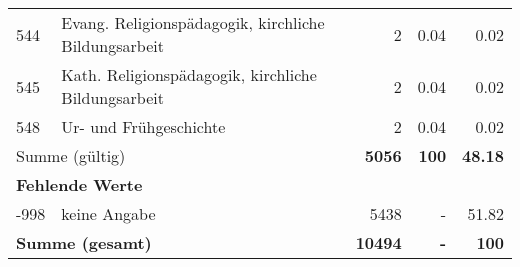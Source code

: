 \begin{longtable}{lXrrr}
        544 & \multicolumn{1}{X}{Evang. Religionspädagogik, kirchliche Bildungsarbeit} & %
          \num{2} &
          \num[round-mode=places,round-precision=2]{0.04} &
          \num[round-mode=places,round-precision=2]{0.02} \\

        545 & \multicolumn{1}{X}{Kath. Religionspädagogik, kirchliche Bildungsarbeit} & %
          \num{2} &
          \num[round-mode=places,round-precision=2]{0.04} &
          \num[round-mode=places,round-precision=2]{0.02} \\

        548 & \multicolumn{1}{X}{Ur- und Frühgeschichte} & %
          \num{2} &
          \num[round-mode=places,round-precision=2]{0.04} &
          \num[round-mode=places,round-precision=2]{0.02} \\

     \midrule
     \multicolumn{2}{l}{Summe (gültig)} &
       \textbf{\num{5056}} &
     \textbf{\num{100}} &
       \textbf{\num[round-mode=places,round-precision=2]{48.18}} \\
     \multicolumn{5}{l}{\textbf{Fehlende Werte}}\\
       -998 &
       keine Angabe &
         \num{5438} &
        - &
         \num[round-mode=places,round-precision=2]{51.82} \\
     \midrule
     \multicolumn{2}{l}{\textbf{Summe (gesamt)}} &
          \textbf{\num{10494}} &
        \textbf{-} &
        \textbf{\num{100}} \\
     \bottomrule
     \end{longtable}
     
